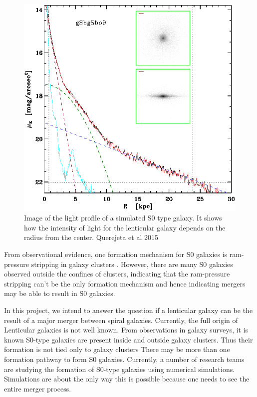 \documentclass[fleqn,usenatbib]{mnras}
\begin{document}
\begin{figure}
    \centering
    \includegraphics{Figures/aa24303-14-fig12.eps}
    \caption{Image of the light profile of a simulated S0 type galaxy. It shows how the intensity of light for the lenticular galaxy depends on the radius from the center. Querejeta et al 2015}
    \label{profile_fig}
\end{figure}
From observational evidence, one formation mechanism for S0 galaxies is ram-pressure stripping in galaxy clusters \citep{Querejeta_2015}. However, there are many S0 galaxies observed outside the confines of clusters, indicating that the ram-pressure stripping can't be the only formation mechanism and hence indicating mergers may be able to result in S0 galaxies.

In this project, we intend to answer the question if a lenticular galaxy can be the result of a major merger between spiral galaxies. Currently, the full origin of Lenticular galaxies is not well known. From observations in galaxy surveys, it is known S0-type galaxies are present inside and outside galaxy clusters. Thus their formation is not tied only to galaxy clusters\citep{van_den_Bergh_2009} There may be more than one formation pathway to form S0 galaxies. Currently, a number of research teams are studying the formation of S0-type galaxies using numerical simulations\citep{Querejeta_2015_2}. Simulations are about the only way this is possible because one needs to see the entire merger process.
\end{document}
